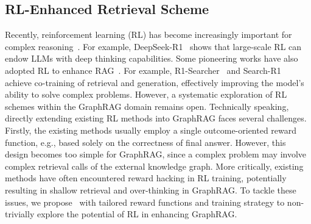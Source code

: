 \subsection{RL-Enhanced Retrieval Scheme}
Recently, reinforcement learning (RL) has become increasingly important for complex reasoning~\cite{xie2025logic,yang2024dollmreasoning,ouyang2022training}. %
For example, DeepSeek-R1~\cite{guo2025deepseek} shows that large-scale RL can endow LLMs with deep thinking capabilities. 
Some pioneering works have also adopted RL to enhance RAG~\cite{jin2025searchr1,song2025r1searcher}. For example, R1-Searcher~\cite{song2025r1searcher} and Search-R1~\cite{jin2025searchr1} achieve co-training of retrieval and generation, effectively improving the model's ability to solve complex problems. However, a systematic exploration of RL schemes within the GraphRAG domain remains open. Technically speaking, directly extending existing RL methods into GraphRAG faces several challenges. Firstly, the existing methods usually employ a single outcome-oriented reward function, e.g., based solely on the correctness of final answer. However, this design becomes too simple for GraphRAG, 
since a complex problem may involve complex retrieval calls
of the external knowledge graph. 
More critically, existing methods have often encountered reward hacking in RL training, potentially resulting in shallow retrieval and over-thinking in GraphRAG. To tackle these issues, we propose \methodname~with tailored reward functions and training strategy to non-trivially explore the potential of RL in enhancing GraphRAG.


